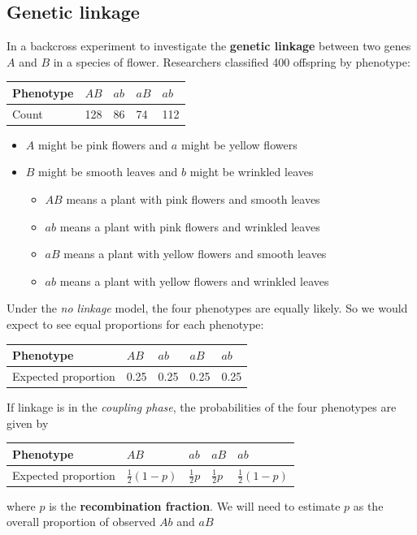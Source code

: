 \documentclass[a4paper]{article}\usepackage[]{graphicx}\usepackage[]{xcolor}
\begin{document}
\subsection{Genetic linkage}
In a backcross experiment to investigate the \textbf{genetic linkage} between two genes \( A \) and \( B \) in a species of flower. Researchers classified 400 offspring by phenotype:
\begin{table}[h]
	\centering
	\begin{tabular}{@{}lllll@{}}
	\textbf{Phenotype} & \( AB \) & \( ab \) & \( aB \) & \( ab \) \\ \midrule
	Count              & 128 & 86 & 74 & 112 \\ 
	\end{tabular}
\end{table}
\begin{itemize}
	\item \( A \) might be pink flowers and \( a \) might be yellow flowers
	\item \( B \) might be smooth leaves and \( b \) might be wrinkled leaves
	\begin{itemize}
		\item \( AB \) means a plant with pink flowers and smooth leaves
		\item \( ab \) means a plant with pink flowers and wrinkled leaves
		\item \( aB \) means a plant with yellow flowers and smooth leaves
		\item \( ab \) means a plant with yellow flowers and wrinkled leaves
	\end{itemize}
\end{itemize}
Under the \textit{no linkage} model, the four phenotypes are equally likely. So we would expect to see equal proportions for each phenotype:
\begin{table}[H]
	\centering
	\begin{tabular}{@{}lllll@{}}
	\textbf{Phenotype} 	& \( AB \) & \( ab \) & \( aB \) & \( ab \) \\ \midrule
	Expected proportion	& 0.25 & 0.25 & 0.25 & 0.25 \\ 
	\end{tabular}
\end{table}
If linkage is in the \textit{coupling phase}, the probabilities of the four phenotypes are given by
\begin{table}[H]
	\centering
	\begin{tabular}{@{}lllll@{}}
	\textbf{Phenotype} 	& \( AB \) & \( ab \) & \( aB \) & \( ab \) \\ \midrule
	Expected proportion & \( \frac{1}{2}(1-p) \) & \( \frac{1}{2}p \) & \( \frac{1}{2}p \) & \( \frac{1}{2}(1-p) \) \\ 
	\end{tabular}
\end{table}
where \( p \) is the \textbf{\textcolor{mygreen}{recombination fraction}}. We will need to estimate \( p \) as the overall proportion of observed \( Ab \) and \( aB \)
\end{document}
